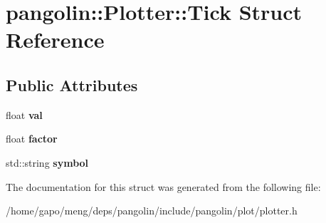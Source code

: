 \hypertarget{structpangolin_1_1_plotter_1_1_tick}{}\section{pangolin\+:\+:Plotter\+:\+:Tick Struct Reference}
\label{structpangolin_1_1_plotter_1_1_tick}
\subsection*{Public Attributes}
\begin{DoxyCompactItemize}
\item 
float {\bfseries val}\hypertarget{structpangolin_1_1_plotter_1_1_tick_a0d35931e9b62a62e188f70e373d11fc5}{}\label{structpangolin_1_1_plotter_1_1_tick_a0d35931e9b62a62e188f70e373d11fc5}

\item 
float {\bfseries factor}\hypertarget{structpangolin_1_1_plotter_1_1_tick_a88175ec4eee1e1e5cd427e2c092c72a1}{}\label{structpangolin_1_1_plotter_1_1_tick_a88175ec4eee1e1e5cd427e2c092c72a1}

\item 
std\+::string {\bfseries symbol}\hypertarget{structpangolin_1_1_plotter_1_1_tick_a5cdfdd47c7fcda2aa6036011b6d97446}{}\label{structpangolin_1_1_plotter_1_1_tick_a5cdfdd47c7fcda2aa6036011b6d97446}

\end{DoxyCompactItemize}


The documentation for this struct was generated from the following file\+:\begin{DoxyCompactItemize}
\item 
/home/gapo/meng/deps/pangolin/include/pangolin/plot/plotter.\+h\end{DoxyCompactItemize}
